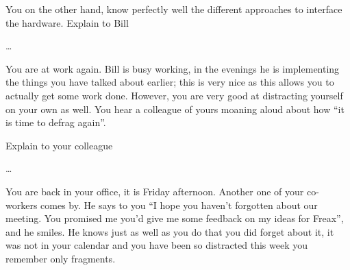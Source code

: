 \documentclass[addpoints]{miunexam}
\begin{document}
\begin{questions}
  You on the other hand, know perfectly well the different approaches to 
  interface the hardware.
  Explain to Bill
  \begin{solution}
    \dots
  \end{solution}

  \question\label{q:fs}
  You are at work again.
  Bill is busy working, in the evenings he is implementing the things you have 
  talked about earlier; this is very nice as this allows you to actually get 
  some work done.
  However, you are very good at distracting yourself on your own as well.
  You hear a colleague of yours moaning aloud about how ``it is time to defrag 
  again''.

  Explain to your colleague
  \begin{solution}
    \dots
  \end{solution}

  \question[6]\label{q:scheduling}
  You are back in your office, it is Friday afternoon.
  Another one of your co-workers comes by.
  He says to you ``I hope you haven't forgotten about our meeting.
  You promised me you'd give me some feedback on my ideas for Freax'', and he 
  smiles.
  He knows just as well as you do that you did forget about it, it was not in 
  your calendar and you have been so distracted this week you remember only 
  fragments.


\end{questions}
\end{document}
